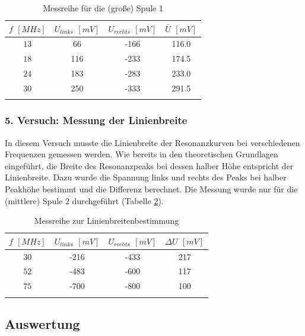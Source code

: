 \documentclass[a4paper,titlepage]{scrartcl}
\numberwithin{equation}{section}
\begin{document}
\begin{longtable}[H]{c|c|c|c}
$f$ $[MHz]$ & $U_{links}$ $[mV]$ & $U_{rechts}$ $[mV]$ & $\overline{U}$ $[mV]$ \\
\hline
$13$ & 66 & -166 & 116.0\\
$18$ & 116 & -233 & 174.5\\
$24$ & 183 & -283 & 233.0\\
$30$ & 250 & -333 & 291.5\\
\caption{Messreihe für die (große) Spule 1}
\label{tab:spule2}
\end{longtable}
\subsubsection{5. Versuch: Messung der Linienbreite}
In diesem Versuch musste die Linienbreite der Resonanzkurven bei verschiedenen Frequenzen gemessen werden. Wie bereits in den theoretischen Grundlagen eingeführt, die Breite des Resonanzpeaks bei dessen halber Höhe entspricht der Linienbreite. Dazu wurde die Spannung links und rechts des Peaks bei halber Peakhöhe bestimmt und die Differenz berechnet. Die Messung wurde nur für die (mittlere) Spule 2 durchgeführt (Tabelle \ref{tab:linienbreite}).
\begin{longtable}[H]{c|c|c|c}
$f$ $[MHz]$ & $U_{links}$ $[mV]$ & $U_{rechts}$ $[mV]$ & $\Delta U$ $[mV]$ \\
\hline
$30$ & -216 & -433 & 217\\
$52$ & -483 & -600 & 117\\
$75$ & -700 & -800 & 100\\
\caption{Messreihe zur Linienbreitenbestimmung}
\label{tab:linienbreite}
\end{longtable}
\subsection{Auswertung}
\end{document}
